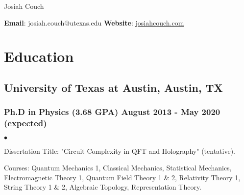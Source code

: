 \documentclass[letterpaper]{article}
\def\name{Josiah Couch}
\renewenvironment{itemize}{
  \begin{list}{$\bullet$}{
    \setlength{\itemsep}{0em}
    \setlength{\parskip}{0em}
    \setlength{\parsep}{0em} 
    \setlength{\topsep}{0em} 
  }
}{
  \end{list}
}
\begin{document}

\centerline{\LARGE \name}

\begin{center}

\small{\textbf{Email}: josiah.couch@utexas.edu \textbf{Website}: \url{josiahcouch.com}}

\end{center}

\section*{Education}

\subsection*{University of Texas at Austin, Austin, TX}
\subsubsection*{Ph.D in Physics (3.68 GPA) \hfill August 2013 - May 2020 (expected)}

\begin{itemize}
\item Dissertation Title: "Circuit Complexity in QFT and Holography" (tentative).

\item Courses: Quantum Mechanics 1, Classical Mechanics, Statistical Mechanics, Electromagnetic Theory 1, Quantum Field Theory 1 \& 2, Relativity Theory 1, String Theory 1 \& 2, Algebraic Topology, Representation Theory.
\end{itemize}


\end{document}
